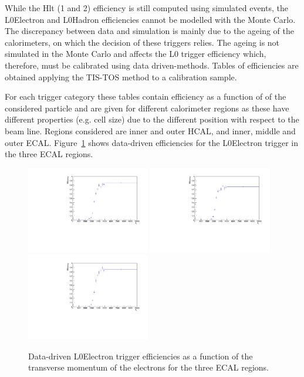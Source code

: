 While the Hlt (1 and 2) efficiency is still computed using simulated events,
the L0Electron and L0Hadron efficiencies cannot be modelled with the Monte Carlo.
The discrepancy between data and simulation is mainly due to the ageing of the 
calorimeters, on which the decision of these triggers relies. The ageing is not simulated
in the Monte Carlo and affects the L0 trigger efficiency which, therefore, must
be calibrated using data driven-methods. Tables of efficiencies are obtained
applying the TIS-TOS method to a calibration sample.

For each trigger category these tables contain efficiency as a function of
\pt of the considered particle and are given for different calorimeter regions
as these have different properties (e.g. cell size) due to the different position
with respect to the beam line. Regions considered are inner and outer HCAL, and inner, middle and outer ECAL.
Figure~\ref{sec:L0eff_tables} shows data-driven efficiencies for the L0Electron trigger
in the three ECAL regions.
%
\begin{figure}[h!]
\centering
\includegraphics[width=0.48\textwidth]{RKst/figs/l0plots/l0E_Inner.pdf}
\includegraphics[width=0.48\textwidth]{RKst/figs/l0plots/l0E_Middle.pdf}
\includegraphics[width=0.48\textwidth]{RKst/figs/l0plots/l0E_Outer.pdf}
\caption{Data-driven L0Electron trigger efficiencies as a function of the transverse momentum
of the electrons for the three ECAL regions.}
\label{sec:L0eff_tables}
\end{figure}

